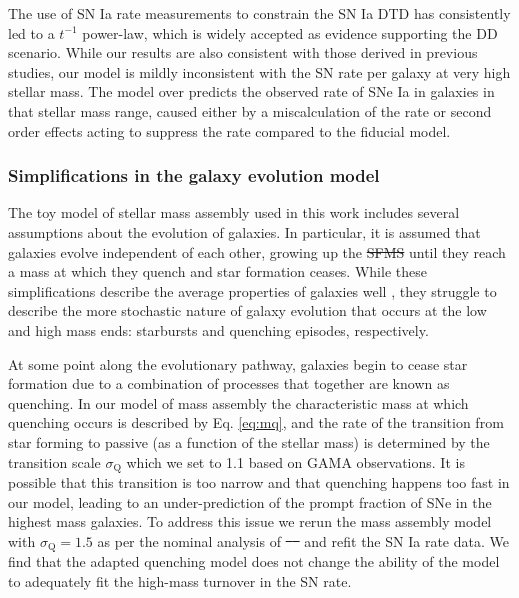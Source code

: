 \documentclass[fleqn,usenatbib]{mnras}
\providecommand{\DIFadd}[1]{{\protect\color{blue}\uwave{#1}}} %
\providecommand{\DIFdel}[1]{{\protect\color{red}\sout{#1}}}                      %
\providecommand{\DIFaddbegin}{} %
\providecommand{\DIFaddend}{} %
\providecommand{\DIFdelbegin}{} %
\providecommand{\DIFdelend}{} %
\newcommand{\DIFscaledelfig}{0.5}
\newlength{\DIFdelgraphicswidth} %
\newlength{\DIFdelgraphicsheight} %
\newcommand{\DIFaddincludegraphics}[2][]{{\color{blue}\fbox{\DIFOincludegraphics[#1]{#2}}}} %
\newcommand{\DIFdelincludegraphics}[2][]{%
\sbox{\DIFdelgraphicsbox}{\DIFOincludegraphics[#1]{#2}}%
\settoboxwidth{\DIFdelgraphicswidth}{\DIFdelgraphicsbox} %
\settoboxtotalheight{\DIFdelgraphicsheight}{\DIFdelgraphicsbox} %
\scalebox{\DIFscaledelfig}{%
\parbox[b]{\DIFdelgraphicswidth}{\usebox{\DIFdelgraphicsbox}\\[-\baselineskip] \rule{\DIFdelgraphicswidth}{0em}}\llap{\resizebox{\DIFdelgraphicswidth}{\DIFdelgraphicsheight}{%
\setlength{\unitlength}{\DIFdelgraphicswidth}%
\begin{picture}(1,1)%
\thicklines\linethickness{2pt} %
{\color[rgb]{1,0,0}\put(0,0){\framebox(1,1){}}}%
{\color[rgb]{1,0,0}\put(0,0){\line( 1,1){1}}}%
{\color[rgb]{1,0,0}\put(0,1){\line(1,-1){1}}}%
\end{picture}%
}\hspace*{3pt}}} %
} %
\DeclareRobustCommand{\DIFaddbegin}{\DIFOaddbegin \let\includegraphics\DIFaddincludegraphics} %
\DeclareRobustCommand{\DIFaddend}{\DIFOaddend \let\includegraphics\DIFOincludegraphics} %
\DeclareRobustCommand{\DIFdelbegin}{\DIFOdelbegin \let\includegraphics\DIFdelincludegraphics} %
\DeclareRobustCommand{\DIFdelend}{\DIFOaddend \let\includegraphics\DIFOincludegraphics} %
\begin{document}
The use of SN Ia rate measurements to constrain the SN Ia DTD has consistently led to a $t^{-1}$ power-law, which is widely accepted as evidence supporting the DD scenario. While our results are also consistent with those derived in previous studies, our model is mildly inconsistent with the SN rate per galaxy at very high stellar mass. The model over predicts the observed rate of SNe Ia in galaxies in that stellar mass range, caused either by a miscalculation of the rate or second order effects acting to suppress the rate compared to the fiducial model.

\subsubsection{Simplifications in the galaxy evolution model}

The toy model of stellar mass assembly used in this work includes several assumptions about the evolution of galaxies. In particular, it is assumed that galaxies evolve independent of each other, growing up the \DIFdelbegin \DIFdel{SFMS }\DIFdelend \DIFaddbegin \DIFadd{star formation main sequence }\DIFaddend until they reach a mass at which they quench and star formation ceases. While these simplifications describe the average properties of galaxies well \citep{Zahid2012, Childress2014}, they struggle to describe the more stochastic nature of galaxy evolution that occurs at the low and high mass ends: starbursts and quenching episodes, respectively. 

At some point along the evolutionary pathway, galaxies begin to cease star formation due to a combination of processes that together are known as quenching. In our model of mass assembly the characteristic mass at which quenching occurs is described by Eq. \ref{eq:mq}, and the rate of the transition from star forming to passive (as a function of the stellar mass) is determined by the transition scale $\sigma_{\mathrm{Q}}$ which we set to 1.1 based on GAMA observations. It is possible that this transition is too narrow and that quenching happens too fast in our model, leading to an under-prediction of the prompt fraction of SNe in the highest mass galaxies. To address this issue we rerun the mass assembly model with $\sigma_{\mathrm{Q}} = 1.5$ as per the nominal analysis of \DIFdelbegin \DIFdel{\mbox{%
\citet{Childress2014} }\hspace{0pt}%
}\DIFdelend \DIFaddbegin \DIFadd{\mbox{%
\citetalias{Childress2014} }\hspace{0pt}%
}\DIFaddend and refit the SN Ia rate data. We find that the adapted quenching model does not change the ability of the model to adequately fit the high-mass turnover in the SN rate.
\end{document}
